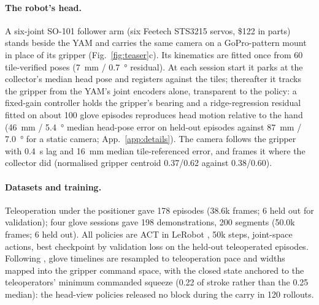 \paragraph{The robot's head.}
A six-joint SO-101 follower arm \citep{so101} (six Feetech STS3215 servos, \$122 in parts) stands beside the YAM and carries the same camera on a GoPro-pattern mount in place of its gripper (Fig.~\ref{fig:teaser}c). Its kinematics are fitted once from 60 tile-verified poses (\SI{7}{mm} / \SI{0.7}{\degree} residual). At each session start it parks at the collector's median head pose and registers against the tiles; thereafter it tracks the gripper from the YAM's joint encoders alone, transparent to the policy: a fixed-gain controller holds the gripper's bearing and a ridge-regression residual fitted on about 100 glove episodes reproduces head motion relative to the hand (\SI{46}{mm} / \SI{5.4}{\degree} median head-pose error on held-out episodes against \SI{87}{mm} / \SI{7.0}{\degree} for a static camera; App.~\ref{app:details}). The camera follows the gripper with \SI{0.4}{s} lag and \SI{16}{mm} median tile-referenced error, and frames it where the collector did (normalised gripper centroid 0.37/0.62 against 0.38/0.60).

\paragraph{Datasets and training.}
Teleoperation under the positioner gave 178 episodes (38.6k frames; 6 held out for validation); four glove sessions gave 198 demonstrations, 200 segments (50.0k frames; 6 held out). All policies are ACT \citep{zhao2023act} in LeRobot \citep{lerobot2024}, 50k steps, joint-space actions, best checkpoint by validation loss on the held-out teleoperated episodes. Following \citet{yamumi2026}, glove timelines are resampled to teleoperation pace and widths mapped into the gripper command space, with the closed state anchored to the teleoperators' minimum commanded squeeze (0.22 of stroke rather than the 0.25 median): the head-view policies released no block during the carry in 120 rollouts.
